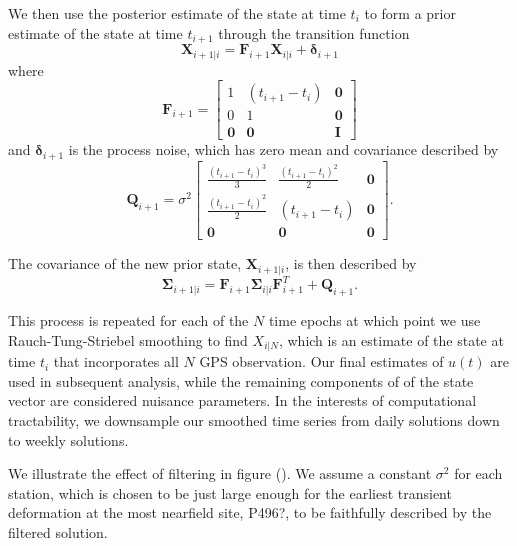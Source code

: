 \documentclass[12pt]{article}
\begin{document}
  We then use the posterior estimate of the state at time $t_i$ to
  form a prior estimate of the state at time $t_{i+1}$ through the
  transition function
  \begin{equation}\label{predict}
    \mathbf{X}_{i+1|i} = \mathbf{F}_{i+1}\mathbf{X}_{i|i} + \mathbf{\delta}_{i+1} 
  \end{equation}
  where 
  \begin{equation}
    \mathbf{F}_{i+1} = 
    \left[
    \begin{array}{ccc}
    1           & (t_{i+1} - t_i) & \mathbf{0}\\
    0           & 1              & \mathbf{0}\\
    \mathbf{0}  & \mathbf{0}     & \mathbf{I}
    \end{array}
    \right]
  \end{equation}
  and $\mathbf{\delta}_{i+1}$ is the process noise, which has zero
  mean and covariance described by
  \begin{equation}
    \mathbf{Q}_{i+1} = 
    \sigma^2 \left[
    \begin{array}{ccc}
    \frac{(t_{i+1} - t_i)^3}{3} & \frac{(t_{i+1} - t_{i})^2}{2} & \mathbf{0}\\
    \frac{(t_{i+1} - t_i)^2}{2} & (t_{i+1} - t_{i}) & \mathbf{0}\\ 
    \mathbf{0} & \mathbf{0} & \mathbf{0}
    \end{array}
    \right].
  \end{equation}

  The covariance of the new prior state, $\mathbf{X}_{i+1|i}$, is then described by
  \begin{equation}
    \mathbf{\Sigma}_{i+1|i} = \mathbf{F}_{i+1}\mathbf{\Sigma}_{i|i}\mathbf{F}^T_{i+1} + \mathbf{Q}_{i+1}.
  \end{equation}

  This process is repeated for each of the $N$ time epochs at which
  point we use Rauch-Tung-Striebel smoothing to find $X_{i|N}$, which
  is an estimate of the state at time $t_i$ that incorporates all $N$
  GPS observation.  Our final estimates of $u(t)$ are used in
  subsequent analysis, while the remaining components of of the state
  vector are considered nuisance parameters. In the interests of
  computational tractability, we downsample our smoothed time series
  from daily solutions down to weekly solutions.

  We illustrate the effect of filtering in figure ().  We assume a
  constant $\sigma^2$ for each station, which is chosen to be just
  large enough for the earliest transient deformation at the most
  nearfield site, P496?, to be faithfully described by the filtered
  solution.
\end{document}
